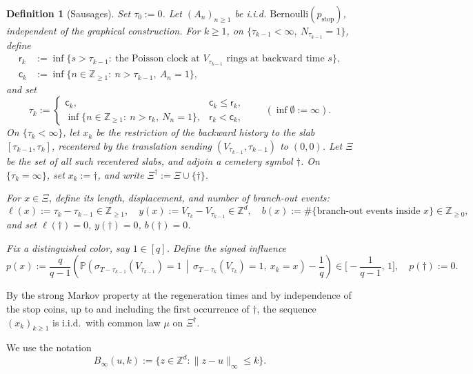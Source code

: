 \documentclass[letterpaper,11pt,reqno]{amsart}
\newtheorem{defn}[thm]{Definition}
\theoremstyle{definition}
\begin{document}
\begin{defn}[Sausages]\label{def:sausages}
Set \(\tau_0:=0\). Let \((A_n)_{n\ge1}\) be i.i.d. \(\mathrm{Bernoulli}(p_{\mathrm{stop}})\),
independent of the graphical construction. For \(k\ge1\), on
\(\{\tau_{k-1}<\infty,\ N_{\tau_{k-1}}=1\}\), define
\begin{align*}
\mathsf r_k&:=\inf\{s>\tau_{k-1}:\ \text{the Poisson clock at }V_{\tau_{k-1}}\text{ rings at backward time }s\},\\
\mathsf c_k&:=\inf\{n\in\mathbb Z_{\ge1}:\ n>\tau_{k-1},\ A_n=1\},
\end{align*}
and set
\[
\tau_k :=
\begin{cases}
\mathsf c_k, & \mathsf c_k\le \mathsf r_k,\\[2pt]
\inf\{n\in\mathbb Z_{\ge1}:\ n>\mathsf r_k,\ N_n=1\}, & \mathsf r_k<\mathsf c_k,
\end{cases}
\qquad(\inf\emptyset:=\infty).
\]
On \(\{\tau_k<\infty\}\), let \(x_k\) be the restriction of the backward history to the slab
\([\tau_{k-1},\tau_k]\), recentered by the translation sending
\((V_{\tau_{k-1}},\tau_{k-1})\) to \((0,0)\). Let \(\Xi\) be the set of all such recentered slabs, and adjoin a cemetery symbol \(\dagger\). On \(\{\tau_k=\infty\}\), set \(x_k:=\dagger\), and write \(\Xi^\dagger:=\Xi\cup\{\dagger\}\).


For $x\in\Xi$, define its length, displacement, and number of branch-out events:
\[
\ell(x):=\tau_k-\tau_{k-1}\in\mathbb{Z}_{\ge1},
\quad
y(x):=V_{\tau_k}-V_{\tau_{k-1}}\in\mathbb{Z}^d,
\quad
b(x):=\#\{\text{branch-out events inside }x\}\in\mathbb Z_{\ge 0},
\]
and set $\ell(\dagger)=0$, $y(\dagger)=0$, $b(\dagger)=0$.

Fix a distinguished color, say $1\in[q]$. Define the signed influence
\[
p(x):=\frac{q}{q-1}\left(
\mathbb P\!\left(
\sigma_{T-\tau_{k-1}}(V_{\tau_{k-1}})=1
\,\middle|\,
\sigma_{T-\tau_k}(V_{\tau_k})=1,\ x_k=x
\right)-\frac1q
\right)\in\Big[-\frac1{q-1},\,1\Big],
\quad p(\dagger):=0.
\]
\end{defn}


By the strong Markov property at the regeneration times and by independence of the stop coins, up to and including the first occurrence of $\dagger$, the sequence $(x_k)_{k\ge1}$ is i.i.d.\ with common law $\mu$ on $\Xi^\dagger$.

We use the notation
\[
    B_\infty(u,k):=\{z\in\mathbb Z^d:\|z-u\|_\infty\le k\}.
\]
\end{document}
